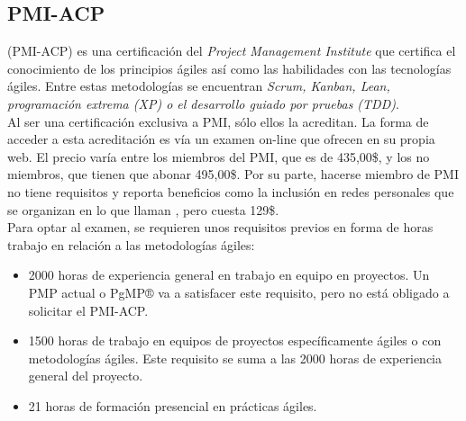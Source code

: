 \subsection{PMI-ACP}

 (PMI-ACP) es una certificación del \emph{Project Management Institute} que certifica el conocimiento de los principios ágiles así como las habilidades con las tecnologías ágiles. Entre estas metodologías se encuentran \emph{Scrum, Kanban, Lean, programación extrema (XP) o el desarrollo guiado por pruebas (TDD)}.\\

Al ser una certificación exclusiva a PMI, sólo ellos la acreditan. La forma de acceder a esta acreditación es vía un examen on-line que ofrecen en su propia web. El precio varía entre los miembros del PMI, que es de 435,00\$, y los no miembros, que tienen que abonar 495,00\$. Por su parte, hacerse miembro de PMI no tiene requisitos y reporta beneficios como la inclusión en redes personales que se organizan en lo que llaman , pero cuesta 129\$.\\

Para optar al examen, se requieren unos requisitos previos en forma de horas trabajo en relación a las metodologías ágiles:
\begin{itemize}
	\item 2000 horas de experiencia general en trabajo en equipo en proyectos. Un PMP actual o PgMP® va a satisfacer este requisito, pero no está obligado a solicitar el PMI-ACP.
	\item 1500 horas de trabajo en equipos de proyectos específicamente ágiles o con metodologías ágiles. Este requisito se suma a las 2000 horas de experiencia general del proyecto.
	\item 21 horas de formación presencial en prácticas ágiles.
\end{itemize}

